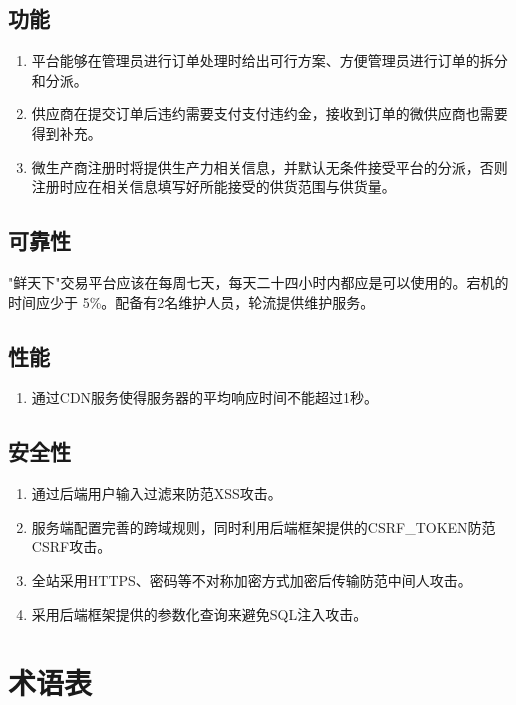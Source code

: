 \subsection{功能}
    \begin{enumerate}
        \item 平台能够在管理员进行订单处理时给出可行方案、方便管理员进行订单的拆分和分派。
        \item 供应商在提交订单后违约需要支付支付违约金，接收到订单的微供应商也需要得到补充。
        \item 微生产商注册时将提供生产力相关信息，并默认无条件接受平台的分派，否则注册时应在相关信息填写好所能接受的供货范围与供货量。
    \end{enumerate}


\subsection{可靠性}

    "鲜天下"交易平台应该在每周七天，每天二十四小时内都应是可以使用的。宕机的时间应少于 5\%。配备有2名维护人员，轮流提供维护服务。


\subsection{性能}
    \begin{enumerate}
        \item 通过CDN服务使得服务器的平均响应时间不能超过1秒。
    \end{enumerate}

\subsection{安全性}
    \begin{enumerate}
        \item 通过后端用户输入过滤来防范XSS攻击。
        \item 服务端配置完善的跨域规则，同时利用后端框架提供的CSRF\_TOKEN防范CSRF攻击。
        \item 全站采用HTTPS、密码等不对称加密方式加密后传输防范中间人攻击。
        \item 采用后端框架提供的参数化查询来避免SQL注入攻击。
    \end{enumerate}

\section{术语表}


